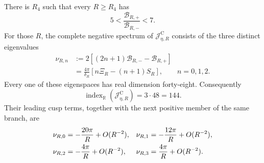 \begin{theorem}
\label{thm:s6cusp-native-jacobi-index}
There is \(R_4\) such that every \(R\ge R_4\) has
\begin{equation}\label{eq:s6cusp-native-ratio-five-seven}
 5<\frac{\mathcal B_{R,+}}{\mathcal B_{R,-}}<7.
\end{equation}
For those \(R\), the complete negative spectrum of
\(\mathcal J^{\mathrm C}_{\eta,R}\) consists of the three distinct
eigenvalues
\begin{align}
 \nu_{R,n}
 &:=2\left[(2n+1)\mathcal B_{R,-}-\mathcal B_{R,+}\right]
 \label{eq:s6cusp-native-negative-bands}\\
 &=\frac{4\pi}{\delta_R}
 \left[n\Xi_R-(n+1)S_R\right],
 \qquad n=0,1,2.
 \label{eq:s6cusp-native-negative-bands-coordinates}
\end{align}
Every one of these eigenspaces has real dimension forty-eight.  Consequently
\begin{equation}\label{eq:s6cusp-native-Morse-index}
 \operatorname{index}_{\mathbb R}
 (\mathcal J^{\mathrm C}_{\eta,R})=3\cdot48=144.
\end{equation}
Their leading cusp terms, together with the next positive member of the same
branch, are
\begin{align}
 \nu_{R,0}&=-\frac{20\pi}{R}+O(R^{-2}),&
 \nu_{R,1}&=-\frac{12\pi}{R}+O(R^{-2}),\notag\\
 \nu_{R,2}&=-\frac{4\pi}{R}+O(R^{-2}),&
 \nu_{R,3}&= \frac{4\pi}{R}+O(R^{-2}).
 \label{eq:s6cusp-native-negative-band-cusp}
\end{align}
\end{theorem}

